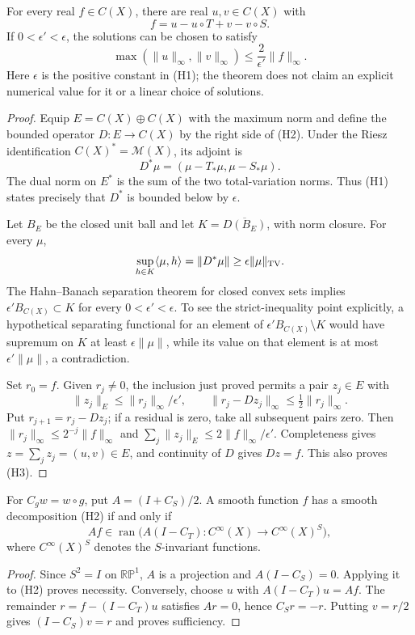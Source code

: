 \begin{theorem}\ours
For every real \(f\in C(X)\), there are real \(u,v\in C(X)\) with
\[
 f=u-u\circ T+v-v\circ S.
 \tag{H2}
\]
If \(0<\epsilon'<\epsilon\), the solutions can be chosen to satisfy
\[
 \max(\|u\|_\infty,\|v\|_\infty)
 \leq \frac{2}{\epsilon'}\|f\|_\infty.
 \tag{H3}
\]
Here \(\epsilon\) is the positive constant in (H1); the theorem does not
claim an explicit numerical value for it or a linear choice of solutions.
\end{theorem}
\begin{proof}
Equip \(E=C(X)\oplus C(X)\) with the maximum norm and define the bounded
operator \(D:E\to C(X)\) by the right side of (H2). Under the Riesz
identification \(C(X)^*=\mathcal M(X)\), its adjoint is
\[
 D^*\mu=(\mu-T_*\mu,\mu-S_*\mu).
\]
The dual norm on \(E^*\) is the sum of the two total-variation norms.
Thus (H1) states precisely that \(D^*\) is bounded below by \(\epsilon\).

Let \(B_E\) be the closed unit ball and let
\(K=\overline{D(B_E)}\), with norm closure. For every \(\mu\),
\[
 \sup_{h\in K}\langle\mu,h\rangle
 =\|D^*\mu\|\geq\epsilon\|\mu\|_{\rm TV}.
\]
The Hahn--Banach separation theorem for closed convex sets implies
\(\epsilon' B_{C(X)}\subset K\) for every \(0<\epsilon'<\epsilon\).
To see the strict-inequality point explicitly, a hypothetical separating
functional for an element of \(\epsilon' B_{C(X)}\setminus K\) would
have supremum on \(K\) at least \(\epsilon\|\mu\|\), while its value
on that element is at most \(\epsilon'\|\mu\|\), a contradiction.

Set \(r_0=f\). Given \(r_j\ne0\), the inclusion just proved permits
a pair \(z_j\in E\) with
\[
 \|z_j\|_E\leq\|r_j\|_\infty/\epsilon',\qquad
 \|r_j-Dz_j\|_\infty\leq\tfrac12\|r_j\|_\infty.
\]
Put \(r_{j+1}=r_j-Dz_j\); if a residual is zero, take all subsequent
pairs zero. Then \(\|r_j\|_\infty\leq2^{-j}\|f\|_\infty\) and
\(\sum_j\|z_j\|_E\leq2\|f\|_\infty/\epsilon'\). Completeness gives
\(z=\sum_j z_j=(u,v)\in E\), and continuity of \(D\) gives
\(Dz=f\). This also proves (H3).
\end{proof}

\begin{proposition}\ours
For \(C_gw=w\circ g\), put \(A=(I+C_S)/2\). A smooth function \(f\)
has a smooth decomposition (H2) if and only if
\[
 Af\in\operatorname{ran}\bigl(A(I-C_T):C^\infty(X)\to
 C^\infty(X)^S\bigr),
 \tag{H4}
\]
where \(C^\infty(X)^S\) denotes the \(S\)-invariant functions.
\end{proposition}
\begin{proof}
Since \(S^2=I\) on \(\mathbb {RP}^{1}\), \(A\) is a projection and
\(A(I-C_S)=0\). Applying it to (H2) proves necessity. Conversely, choose
\(u\) with \(A(I-C_T)u=Af\). The remainder
\(r=f-(I-C_T)u\) satisfies \(Ar=0\), hence \(C_Sr=-r\).
Putting \(v=r/2\) gives \((I-C_S)v=r\) and proves sufficiency.
\end{proof}

